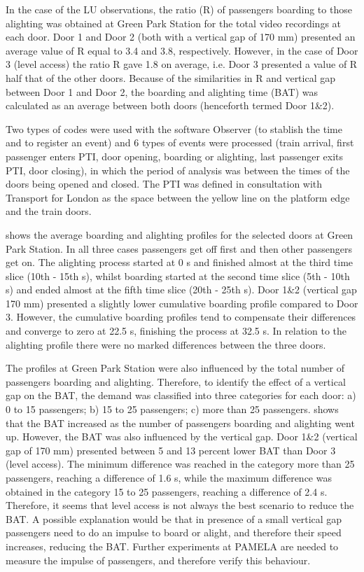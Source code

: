 In the case of the LU observations, the ratio (R) of passengers boarding to those alighting was obtained at Green Park Station for the total video recordings at each door. Door 1 and Door 2 (both with a vertical gap of 170 mm) presented an average value of R equal to 3.4 and 3.8, respectively. However, in the case of Door 3 (level access) the ratio R gave 1.8 on average, i.e. Door 3 presented a value of R half that of the other doors. Because of the similarities in R and vertical gap between Door 1 and Door 2, the boarding and alighting time (BAT) was calculated as an average between both doors (henceforth termed Door 1\&2).

Two types of codes were used with the software Observer (to stablish the time and to register an event) and 6 types of events were processed (train arrival, first passenger enters PTI, door opening, boarding or alighting, last passenger exits PTI, door closing), in which the period of analysis was between the times of the doors being opened and closed. The PTI was defined in consultation with Transport for London as the space between the yellow line on the platform edge and the train doors.

 shows the average boarding and alighting profiles for the selected doors at Green Park Station. In all three cases passengers get off first and then other passengers get on. The alighting process started at 0 s and finished almost at the third time slice (10th - 15th s), whilst boarding started at the second time slice (5th - 10th s) and ended almost at the fifth time slice (20th - 25th s). Door 1\&2 (vertical gap 170 mm) presented a slightly lower cumulative boarding profile compared to Door 3. However, the cumulative boarding profiles tend to compensate their differences and converge to zero at 22.5 s, finishing the process at 32.5 s. In relation to the alighting profile there were no marked differences between the three doors.
 
 The profiles at Green Park Station were also influenced by the total number of passengers boarding and alighting. Therefore, to identify the effect of a vertical gap on the BAT, the demand was classified into three categories for each door: a) 0 to 15 passengers; b) 15 to 25 passengers; c) more than 25 passengers.  shows that the BAT increased as the number of passengers boarding and alighting went up. However, the BAT was also influenced by the vertical gap. Door 1\&2 (vertical gap of 170 mm) presented between 5 and 13 percent lower BAT than Door 3 (level access). The minimum difference was reached in the category more than 25 passengers, reaching a difference of 1.6 s, while the maximum difference was obtained in the category 15 to 25 passengers, reaching a difference of 2.4 s. Therefore, it seems that level access is not always the best scenario to reduce the BAT. A possible explanation would be that in presence of a small vertical gap passengers need to do an impulse to board or alight, and therefore their speed increases, reducing the BAT. Further experiments at PAMELA are needed to measure the impulse of passengers, and therefore verify this behaviour. 

